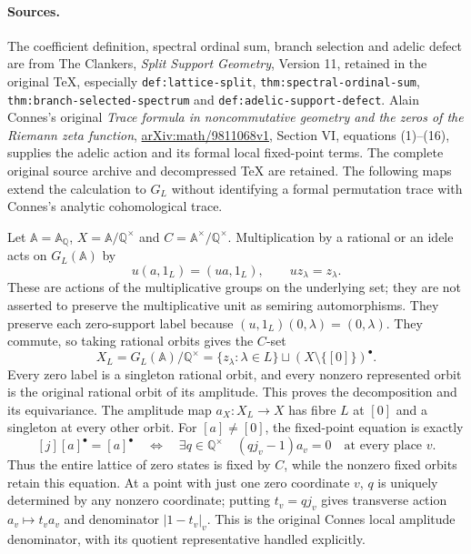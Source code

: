 \documentclass[11pt]{article}
\begin{document}
\paragraph{Sources.}
The coefficient definition, spectral ordinal sum, branch selection and
adelic defect are from The Clankers, \emph{Split Support Geometry},
Version 11, retained in the original TeX, especially
\texttt{def:lattice-split}, \texttt{thm:spectral-ordinal-sum},
\texttt{thm:branch-selected-spectrum} and
\texttt{def:adelic-support-defect}.
Alain Connes's original \emph{Trace formula in noncommutative geometry
and the zeros of the Riemann zeta function},
\href{https://arxiv.org/abs/math/9811068}{arXiv:math/9811068v1},
Section VI, equations (1)--(16), supplies the adelic action and its
formal local fixed-point terms. The complete original source archive
and decompressed TeX are retained. The following maps extend the
calculation to $G_L$ without identifying a formal permutation trace
with Connes's analytic cohomological trace.

Let $\mathbb A=\mathbb A_{\mathbb Q}$, $X=\mathbb A/\mathbb Q^\times$
and $C=\mathbb A^\times/\mathbb Q^\times$. Multiplication by a rational
or an idele acts on $G_L(\mathbb A)$ by
\[
u(a,1_L)=(ua,1_L),\qquad uz_\lambda=z_\lambda.
\tag{FLC1}
\]
These are actions of the multiplicative groups on the underlying set;
they are not asserted to preserve the multiplicative unit as semiring
automorphisms. They preserve each zero-support label because
$(u,1_L)(0,\lambda)=(0,\lambda)$.
They commute, so taking rational orbits gives the $C$-set
\[
X_L=G_L(\mathbb A)/\mathbb Q^\times
 =\{z_\lambda:\lambda\in L\}
   \sqcup (X\setminus\{[0]\})^\bullet.
\tag{FLC2}
\]
Every zero label is a singleton rational orbit, and every nonzero
represented orbit is the original rational orbit of its amplitude.
This proves the decomposition and its equivariance. The amplitude
map $a_X:X_L\to X$ has fibre $L$ at $[0]$ and a singleton at every
other orbit. For $[a]\ne[0]$, the fixed-point equation is exactly
\[
[j][a]^\bullet=[a]^\bullet
\quad\Longleftrightarrow\quad
\exists q\in\mathbb Q^\times\quad(qj_v-1)a_v=0
\quad\text{at every place }v.
\tag{FLC3}
\]
Thus the entire lattice of zero states is fixed by $C$, while the
nonzero fixed orbits retain this equation. At a point with just one
zero coordinate $v$, $q$ is uniquely determined by any nonzero
coordinate; putting $t_v=qj_v$ gives transverse action
$a_v\mapsto t_va_v$ and denominator $|1-t_v|_v$.
This is the original Connes local amplitude denominator, with its
quotient representative handled explicitly.
\end{document}
